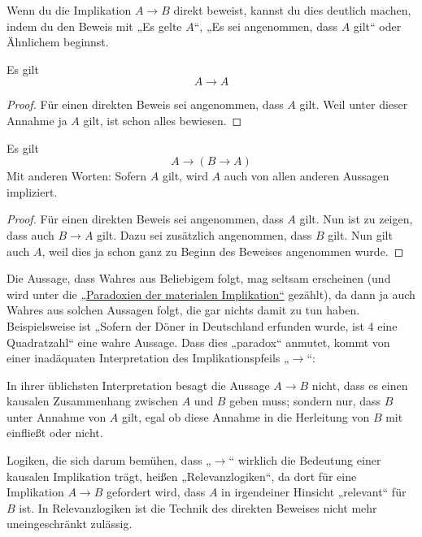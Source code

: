   
\begin{bem}[Signalwörter]
    Wenn du die Implikation $A\to B$ direkt beweist, kannst du dies deutlich machen, indem du den Beweis mit „Es gelte $A$“, „Es sei angenommen, dass $A$ gilt“ oder Ähnlichem beginnst.
\end{bem}

  
\begin{satz} \label{implikationref}
    Es gilt
    \[ A\to A \]
\end{satz}
\begin{proof}
    Für einen direkten Beweis sei angenommen, dass $A$ gilt. Weil unter dieser Annahme ja $A$ gilt, ist schon alles bewiesen.
\end{proof}

  
\begin{satz}\label{wahresausbeliebigem}
    Es gilt
        \[ A \to (B\to A)   \]
    Mit anderen Worten: Sofern $A$ gilt, wird $A$ auch von allen anderen Aussagen impliziert.
\end{satz}
\begin{proof}
    Für einen direkten Beweis sei angenommen, dass $A$ gilt. Nun ist zu zeigen, dass auch $B\to A$ gilt. Dazu sei zusätzlich angenommen, dass $B$ gilt. Nun gilt auch $A$, weil dies ja schon ganz zu Beginn des Beweises angenommen wurde.
\end{proof}


\begin{bem} \label{keinekausalitaet}
    Die Aussage, dass Wahres aus Beliebigem folgt, mag seltsam erscheinen (und wird unter die \href{https://de.wikipedia.org/wiki/Paradoxien_der_materialen_Implikation}{„Paradoxien der materialen Implikation“} gezählt), da dann ja auch Wahres aus solchen Aussagen folgt, die gar nichts damit zu tun haben. Beispielsweise ist „Sofern der Döner in Deutschland erfunden wurde, ist $4$ eine Quadratzahl“ eine wahre Aussage. Dass dies „paradox“ anmutet, kommt von einer inadäquaten Interpretation des Implikationspfeils „$\to$“:
    
    In ihrer üblichsten Interpretation besagt die Aussage $A\to B$ nicht, dass es einen kausalen Zusammenhang zwischen $A$ und $B$ geben muss; sondern nur, dass $B$ unter Annahme von $A$ gilt, egal ob diese Annahme in die Herleitung von $B$ mit einfließt oder nicht.

    Logiken, die sich darum bemühen, dass „$\to$“ wirklich die Bedeutung einer kausalen Implikation trägt, heißen „Relevanzlogiken“, da dort für eine Implikation $A\to B$ gefordert wird, dass $A$ in irgendeiner Hinsicht „relevant“ für $B$ ist. In Relevanzlogiken ist die Technik des direkten Beweises nicht mehr uneingeschränkt zulässig.
\end{bem}


